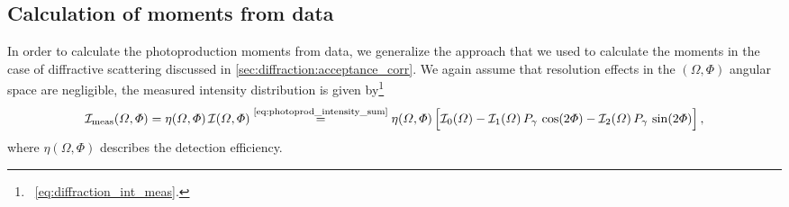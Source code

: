 \subsection{Calculation of moments from data}%
\label{sec:photoprod:moments_data}

In order to calculate the photoproduction moments from data, we
generalize the approach that we used to calculate the moments in the
case of diffractive scattering discussed in
\cref{sec:diffraction:acceptance_corr}.  We again assume that
resolution effects in the $(\Omega, \Phi)$ angular space are
negligible, \ie the measured intensity distribution is given
by\footnote{\Confer\ \cref{eq:diffraction_int_meas}.}
\begin{equation}
  \label{eq:photoprod_intensity_meas}
  \intensity_\text{meas}(\Omega, \Phi)
  = \eta(\Omega, \Phi)\, \intensity(\Omega, \Phi)
  \equalUsing{\cref{eq:photoprod_intensity_sum}} \eta(\Omega, \Phi) \sBrk[2]{\intensity_0(\Omega)
  - \intensity_1(\Omega)\, P_\gamma\, \cos(2 \Phi)
  - \intensity_2(\Omega)\, P_\gamma\, \sin(2 \Phi)},
\end{equation}
where $\eta(\Omega, \Phi)$ describes the detection efficiency.


